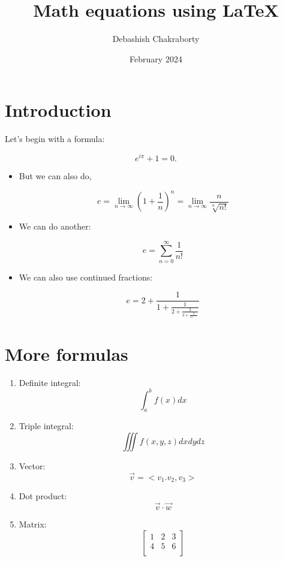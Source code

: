 \documentclass{article}
\title{Math equations using LaTeX}
\author{Debashish Chakraborty}
\date{February 2024}
\begin{document}
\maketitle

\section*{Introduction}
Let's begin with a formula:

$$\textit{$e^{i\pi}+1=0$.}$$

\begin{itemize}
\item But we can also do,

$$e= \lim_{n\to\infty} \left(1+\frac{1}{n}\right)^n = \lim_{n\to\infty} \frac{n}{\sqrt[n]{n!}} $$

\item We can do another:

$$e = \sum_{n=0}^\infty \frac{1}{n!}$$

\item We can also use continued fractions:

$$e = 2+\frac{1}{1+\frac{1}{2+\frac{2}{3+\frac{3}{4+\ddots}}}}$$
\end{itemize}

\section*{More formulas}
\begin{enumerate}
\item Definite integral:
$$\int_a^bf(x)dx$$
\item Triple integral: 
$$\iiint f(x,y,z)dxdydz$$
\item Vector:
$$\vec{v} = <v_1.v_2,v_3>$$
\item Dot product:
$$\vec{v}\cdot\vec{w}$$
\item Matrix:
$$\begin{bmatrix}
1 & 2 & 3\\
4 & 5 & 6\\
\end{bmatrix}
$$
\end{enumerate}

\end{document}
